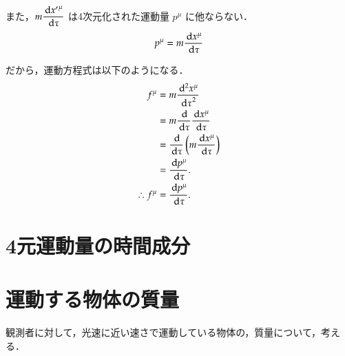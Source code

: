     また，$m \displaystyle \frac{\,\mathrm{d} {x'}^{\mu}}{\,\mathrm{d} \tau}$ は4次元化された運動量 $p^{\mu}$ に他ならない．
        \[
            p^{\mu} = m \frac{\,\mathrm{d} {x}^{\mu}}{\,\mathrm{d} \tau}
        \]

    だから，運動方程式は以下のようになる．
        \begin{align}
            {f}^{\mu} &= m \frac{\,\mathrm{d}^{2} {x}^{\mu}}{{\,\mathrm{d} \tau}^{2}} \notag \\
                      &= m \frac{\,\mathrm{d} }{{\,\mathrm{d} \tau}} \frac{\,\mathrm{d} {x}^{\mu}}{\,\mathrm{d} \tau} \notag \\
                      &=   \frac{\,\mathrm{d} }{{\,\mathrm{d} \tau}} \left( m \frac{\,\mathrm{d} {x}^{\mu}}{\,\mathrm{d} \tau} \right) \notag \\
                      &=   \frac{\,\mathrm{d} p^{\mu}}{{\,\mathrm{d} \tau}}. \notag \\
            \therefore {f}^{\mu} &= \frac{\,\mathrm{d} p^{\mu}}{{\,\mathrm{d} \tau}}.
        \end{align}

\section{4元運動量の時間成分}

\section{運動する物体の質量}
        観測者に対して，光速に近い速さで運動している物体の，質量について，考える．

